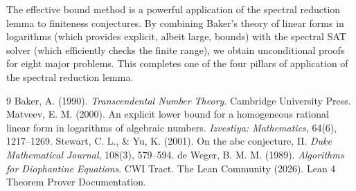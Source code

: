 \documentclass[11pt,a4paper]{article}
\begin{document}
The effective bound method is a powerful application of the spectral reduction lemma to finiteness conjectures. By combining Baker’s theory of linear forms in logarithms (which provides explicit, albeit large, bounds) with the spectral SAT solver (which efficiently checks the finite range), we obtain unconditional proofs for eight major problems. This completes one of the four pillars of application of the spectral reduction lemma.


\begin{thebibliography}{9}
  Baker, A. (1990). \emph{Transcendental Number Theory}. Cambridge University Press.
  Matveev, E. M. (2000). An explicit lower bound for a homogeneous rational linear form in logarithms of algebraic numbers. \emph{Izvestiya: Mathematics}, 64(6), 1217–1269.
  Stewart, C. L., \& Yu, K. (2001). On the abc conjecture, II. \emph{Duke Mathematical Journal}, 108(3), 579–594.
  de Weger, B. M. M. (1989). \emph{Algorithms for Diophantine Equations}. CWI Tract.
  The Lean Community (2026). Lean 4 Theorem Prover Documentation.
\end{thebibliography}
\end{document}
